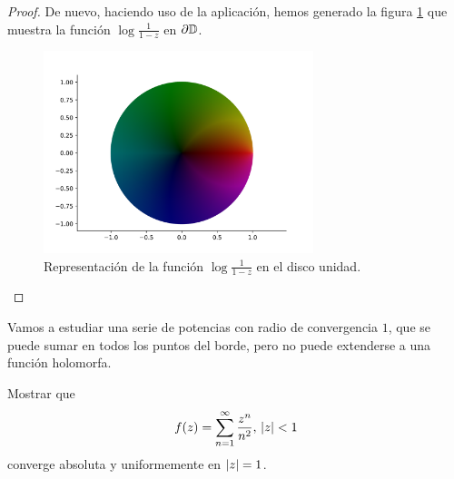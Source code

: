 \begin{proof}
    De nuevo, haciendo uso de la aplicación, hemos generado la figura  \ref{fig:ejemplo2} que muestra la función $\log{\frac{1}{1 - z}}$ en $\partial \mathbb{D}$. \\

\begin{figure}[!htbp]
    \centering
    \includegraphics[width=0.7\textwidth]{../Aplicacion/log(1:(1-z)).png}
    \caption{Representación de la función $\log{\frac{1}{1 - z}}$ en el disco unidad.}
    \label{fig:ejemplo2}
\end{figure}



\end{proof}


Vamos a estudiar una serie de potencias con radio de convergencia $1$, que se puede sumar en todos los puntos del borde, pero no puede extenderse a una función holomorfa. \\

\begin{example}
    Mostrar que
    \begin{equation*}
        f(z) = \sum_{n=1}^{\infty} \frac{z^n}{n^2}, \, \left\lvert z\right\rvert < 1
    \end{equation*}
    converge absoluta y uniformemente en $\left\lvert z\right\rvert = 1$.
\end{example}

